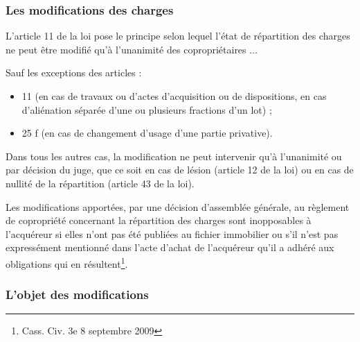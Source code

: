 		\subsubsection{Les modifications des charges}
		
			L'article 11 de la loi pose le principe selon lequel l'état de répartition des charges ne peut être modifié qu'à l'unanimité des copropriétaires $\dots$
			
			Sauf les exceptions des articles :
			\begin{itemize}
				\item 11 (en cas de travaux ou d'actes d'acquisition ou de dispositions, en cas d'aliénation séparée d'une ou plusieurs fractions d'un lot) ;
				\item 25 f (en cas de changement d'usage d'une partie privative).
			\end{itemize}
			
			Dans tous les autres cas, la modification ne peut intervenir qu'à l'unanimité ou par décision du juge, que ce soit en cas de lésion (article 12 de la loi) ou en cas de nullité de la répartition (article 43 de la loi).
			
			Les modifications apportées, par une décision d’assemblée générale, au règlement de copropriété concernant la répartition des charges sont inopposables à l’acquéreur si elles n’ont pas été publiées au fichier immobilier ou s’il n’est pas expressément mentionné dans l’acte d’achat de l’acquéreur qu’il a adhéré aux obligations qui en résultent\footnote{Cass. Civ. 3e 8 septembre 2009}.
			
		\subsubsection{L’objet des modifications}
		
